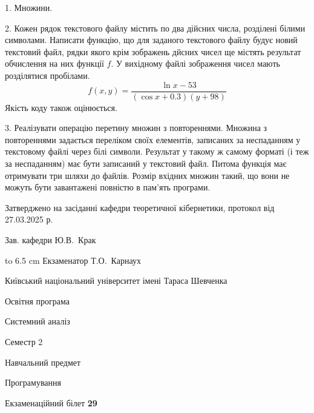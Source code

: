 \documentclass[12pt, ukrainian]{article}
\begin{document}
{%
1. Множини.%
\par
\vspace{2mm}

2. Кожен рядок текстового файлу містить по два дійсних числа, розділені білими символами.
Написати функцію, що для заданого текстового файлу будує новий текстовий файл, рядки якого крім зображень дйсних чисел ще містять результат обчислення на них функції $f$. У вихідному файлі зображення чисел мають розділятися пробілами. 
$$f(x, y) =\frac{\ln x - 53}{(\cos x + 0.3) (y + 98)}$$ 
Якість коду також оцінюється.

\par
\vspace{2mm}

3. Реалізувати операцію перетину множин з повтореннями. Множина з повтореннями задається переліком своїх елементів, записаних за неспаданням у текстовому файлі через білі символи. Результат у такому ж самому форматі (і теж за неспаданням) має бути записаний у текстовий файл. Питома функція має отримувати три шляхи до файлів. Розмір вхідних множин такий, що вони не можуть бути завантажені повністю в пам’ять програми.

}
{\smallskip\smallskip \begin {scriptsize} Затверджено на засіданні кафедри теоретичної кібернетики, протокол   від   27.03.2025 р.\par\smallskip\smallskip\smallskip\smallskip
{\parbox {6.5 cm} {Зав. кафедри \dotfill Ю.В.~Крак}}\hspace {0.7cm} {\hbox to 6.5 cm { Екзаменатор \dotfill Т.О.~Карнаух}} \end{scriptsize}}
\newpage
{{\begin {scriptsize}\par
{ \center  Київський національний університет імені Тараса Шевченка \par}
{\parbox {5 cm}{Освітня програма \hfill}{\parbox {7 cm}{Системний аналіз\hfill}}\parbox {6 cm}{\hfill Семестр 2}}\par
{\parbox {5 cm} {Навчальний предмет \hfill}\parbox {7 cm}{Програмування \hfill}\parbox {6cm}{\hfill}\par}\vspace{-15pt} \end{scriptsize}}{\center Екзаменаційний білет \No \textbf { 29 }\par}}
\end{document}
